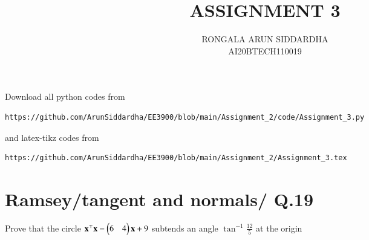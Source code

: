 \documentclass[journal,12pt,twocolumn]{IEEEtran}
\begin{document}
     \def\centbox#1{\makebox[0in]{#1}}
     \def\topbox#1{\raisebox{-\baselineskip}[0in][0in]{#1}}
     \def\midbox#1{\raisebox{-0.5\baselineskip}[0in][0in]{#1}}
\vspace{3cm}
\title{ASSIGNMENT 3}
\author{RONGALA ARUN SIDDARDHA \\ AI20BTECH110019}
\maketitle
\newpage
\bigskip
\renewcommand{\thefigure}{\theenumi}
\renewcommand{\thetable}{\theenumi}
Download all python codes from 
\begin{lstlisting}
https://github.com/ArunSiddardha/EE3900/blob/main/Assignment_2/code/Assignment_3.py
\end{lstlisting}
%
and latex-tikz codes from 
%
\begin{lstlisting}
https://github.com/ArunSiddardha/EE3900/blob/main/Assignment_2/Assignment_3.tex
\end{lstlisting}
%
\section{Ramsey/tangent and normals/ Q.19}
Prove that the circle $\mathbf{x}^\top\mathbf{x}-\begin{pmatrix}6 & 4\end{pmatrix}\mathbf{x} + 9$ subtends an angle $\tan^{-1}{\frac{12}{5}}$ at the origin
%
\end{document}
